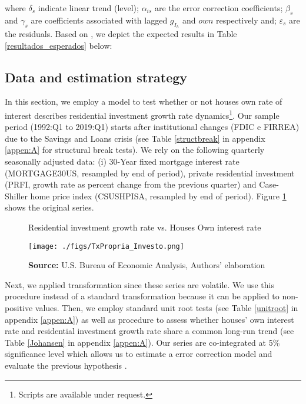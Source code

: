 \documentclass[12pt, a4paper]{article}
\begin{document}
where \(\delta_s\) indicate linear trend (level);
\(\alpha_{is}\) are the error correction coefficients; 
\(\beta_s\) and \(\gamma_s\) are coefficients associated with lagged \(g_{I_h}\) and \(own\) respectively and; \(\varepsilon_s\) are the residuals.
Based on \textcite{teixeira_crescimento_2015}, we depict the expected results in Table \ref{resultados_esperados} below:



\subsection{Data and estimation strategy}
\label{sec:orgc5c83ca}
\label{sec:estimation}


In this section, we employ a model to test whether or not houses own rate of interest describes residential investment growth rate dynamics\footnote{Scripts are available under request.}.
Our sample period (1992:Q1 to 2019:Q1) starts after institutional changes (FDIC e
FIRREA) due to the Savings and Loans crisis (see Table \ref{structbreak} in appendix \ref{appen:A} for structural break tests).
We rely on the following  quarterly seasonally adjusted data: (i) 30-Year fixed mortgage interest rate (MORTGAGE30US, resampled by end of period), private residential investment (PRFI, growth rate as percent change from the previous quarter) and Case-Shiller home price index
(CSUSHPISA, resampled by end of period). Figure \ref{propria_investo}  shows the original series.

\begin{figure}[htb]
	\centering
	\caption{Residential investment growth rate vs. Houses Own interest rate}
	\label{propria_investo}
	\texttt{[image: ./figs/TxPropria\_Investo.png]}
	\caption*{\textbf{Source:} U.S. Bureau of Economic Analysis, Authors' elaboration}
\end{figure}


Next, we applied \textcite{yeo_new_2000} transformation since these series are volatile. We use this procedure instead of a standard \textcite{box_analysis_1964} transformation  because it can be applied to non-positive values.
Then, we employ standard unit root tests (see Table \ref{unitroot} in appendix \ref{appen:A}) as well as \textcite{johansen_estimation_1991} procedure to assess whether houses' own interest rate and residential investment growth rate share a common long-run trend (see Table \ref{Johansen} in appendix \ref{appen:A}).
Our series are co-integrated at 5\% significance level which allows us to estimate a error correction model and evaluate the previous hypothesis \cite{enders_applied_2014}.
\end{document}
